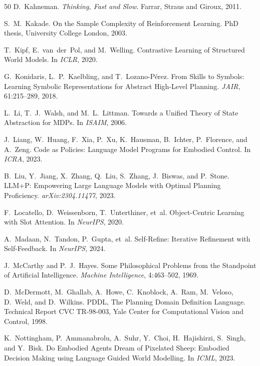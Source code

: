 \documentclass{article}
\begin{document}
\begin{thebibliography}{50}
D.~Kahneman.
\newblock \emph{Thinking, Fast and Slow}.
\newblock Farrar, Straus and Giroux, 2011.

S.~M.~Kakade.
\newblock On the Sample Complexity of Reinforcement Learning.
\newblock PhD thesis, University College London, 2003.

T.~Kipf, E.~van~der~Pol, and M.~Welling.
\newblock Contrastive Learning of Structured World Models.
\newblock In \emph{ICLR}, 2020.

G.~Konidaris, L.~P.~Kaelbling, and T.~Lozano-P{\'e}rez.
\newblock From Skills to Symbols: Learning Symbolic Representations for Abstract High-Level Planning.
\newblock \emph{JAIR}, 61:215--289, 2018.

L.~Li, T.~J.~Walsh, and M.~L.~Littman.
\newblock Towards a Unified Theory of State Abstraction for MDPs.
\newblock In \emph{ISAIM}, 2006.

J.~Liang, W.~Huang, F.~Xia, P.~Xu, K.~Hausman, B.~Ichter, P.~Florence, and A.~Zeng.
\newblock Code as Policies: Language Model Programs for Embodied Control.
\newblock In \emph{ICRA}, 2023.

B.~Liu, Y.~Jiang, X.~Zhang, Q.~Liu, S.~Zhang, J.~Biswas, and P.~Stone.
\newblock LLM+P: Empowering Large Language Models with Optimal Planning Proficiency.
\newblock \emph{arXiv:2304.11477}, 2023.

F.~Locatello, D.~Weissenborn, T.~Unterthiner, et~al.
\newblock Object-Centric Learning with Slot Attention.
\newblock In \emph{NeurIPS}, 2020.

A.~Madaan, N.~Tandon, P.~Gupta, et~al.
\newblock Self-Refine: Iterative Refinement with Self-Feedback.
\newblock In \emph{NeurIPS}, 2024.

J.~McCarthy and P.~J.~Hayes.
\newblock Some Philosophical Problems from the Standpoint of Artificial Intelligence.
\newblock \emph{Machine Intelligence}, 4:463--502, 1969.

D.~McDermott, M.~Ghallab, A.~Howe, C.~Knoblock, A.~Ram, M.~Veloso, D.~Weld, and D.~Wilkins.
\newblock PDDL, The Planning Domain Definition Language.
\newblock Technical Report CVC TR-98-003, Yale Center for Computational Vision and Control, 1998.

K.~Nottingham, P.~Ammanabrolu, A.~Suhr, Y.~Choi, H.~Hajishirzi, S.~Singh, and Y.~Bisk.
\newblock Do Embodied Agents Dream of Pixelated Sheep: Embodied Decision Making using Language Guided World Modelling.
\newblock In \emph{ICML}, 2023.


\end{thebibliography}
\end{document}
